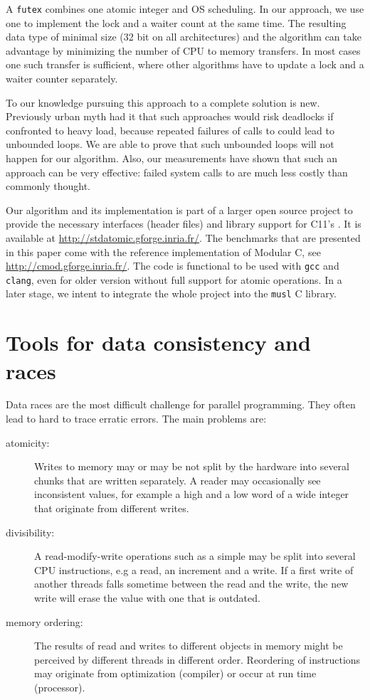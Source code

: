 A \texttt{futex} combines one atomic integer and OS scheduling.
In our approach, we
use one  to
implement the lock and a waiter count at the same time.
The resulting data type of minimal size (32 bit on all
architectures) and the algorithm can take advantage
by minimizing the number of CPU to memory transfers. In most cases
one such transfer is sufficient, where other algorithms have to
update a lock and a waiter counter separately.

To our knowledge pursuing this approach to a complete solution is
new. Previously urban myth had it that such approaches would risk
deadlocks if confronted to heavy load, because repeated failures of
calls to  could lead to unbounded loops. We are able to
prove that such unbounded loops will not happen for our algorithm.
Also, our measurements have shown that such an approach can be very
effective: failed system calls to  are much less costly
than commonly thought.

Our algorithm and its implementation is part of a larger open source
project to provide the necessary interfaces (header files) and library
support for C11's . It is available at
\url{http://stdatomic.gforge.inria.fr/}. The benchmarks that are presented
in this paper come with the reference implementation of Modular C, see
\url{http://cmod.gforge.inria.fr/}.  The code is functional to be used with
\texttt{gcc} and \texttt{clang}, even for older version without full
support for atomic operations.  In a later stage, we intent to integrate
the whole project into the \texttt{musl} C library.
\clearpage

\section{Tools for data consistency and races}
\label{sec-2}

Data races are the most difficult challenge for parallel
programming. They often lead to hard to trace erratic errors.
\iflong
The main problems are:\itemadjust

\begin{description}
\item[{atomicity:}] Writes to memory may or may be not split by the
hardware into several chunks that are written
separately. A reader may occasionally see
inconsistent values, for example a high and a low
word of a wide integer that originate from different
writes.\itemadjust
\item[{divisibility:}] A read-modify-write operations such as a simple
 may be split into several CPU instructions,
e.g a read, an increment and a write. If a first
write of another threads falls sometime between
the read and the write, the new write will erase
the value with one that is outdated.\itemadjust
\item[{memory ordering:}] The results of read and writes to different
objects in memory might be perceived by different threads in
different order. Reordering of instructions may originate from
optimization (compiler) or occur at run time (processor).
\end{description}

